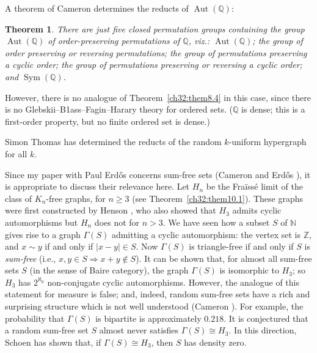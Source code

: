 \documentclass{book}
\newtheorem{theorem}{Theorem}
\DeclareMathOperator{\Sym}{Sym}
\DeclareMathOperator{\Aut}{Aut}
\begin{document}
A theorem of Cameron \cite{ch32:bib4} determines the reducts of
$\Aut(\mathbb{Q})$:

\begin{theorem}\label{ch32:them10.2} 
There are just five closed permutation groups
containing the group $\Aut(\mathbb{Q})$ of order-preserving
permutations of $\mathbb{Q}$, viz.: $\Aut(\mathbb{Q})$; the group of
order preserving or reversing permutations; the group of
permutations preserving a cyclic order; the group of permutations
preserving or reversing a cyclic order; and $\Sym(\mathbb{Q})$.
\end{theorem}

However, there is no analogue of Theorem~\ref{ch32:them8.4} in this
case, since there is no Glebskii--B1ass--Fagin--Harary theory for
ordered sets. ($\mathbb{Q}$ is dense; this is a first-order property,
but no finite ordered set is dense.)

Simon Thomas \cite{ch32:new15} has determined the reducts of the random
$k$-uniform hypergraph for all $k$.

Since my paper with Paul Erd\H{o}s concerns sum-free sets (Cameron
and Erd\H{o}s \cite{ch32:bib8}), it is appropriate to discuss their
relevance here. Let $H_n$ be the Fra\"{i}ss\'{e} limit of the class
of $K_n$-free graphs, for $n \geq 3$ (see
Theorem~\ref{ch32:them10.1}). These graphs were first constructed
by Henson \cite{ch32:bib26}, who also showed that $H_3$ admits
cyclic automorphisms but $H_n$ does not for $n > 3$. We have seen
how a subset $S$ of $\mathbb{N}$ gives rise to a graph $\Gamma(S)$
admitting a cyclic automorphism: the vertex set is $\mathbb{Z}$, and
$x \sim y$ if and only if $|x - y|\in S$. Now $\Gamma(S)$ is
triangle-free if and only if $S$ is \emph{sum-free} (i.e., $x,y
\in S \Rightarrow x + y \notin S$). It can be shown that, for almost
all sum-free sets $S$ (in the sense of Baire category), the graph
$\Gamma(S)$ is isomorphic to $H_3$; so $H_3$ has $2^{\aleph_0}$
non-conjugate cyclic automorphisms. However, the analogue of this
statement for measure is false; and, indeed, random sum-free sets
have a rich and surprising structure which is not well understood
(Cameron \cite{ch32:bib5}). For example, the probability that
$\Gamma(S)$ is bipartite is approximately $0.218$. It is conjectured
that a random sum-free set $S$ almost never satisfies $\Gamma(S)\cong H_3$.
In this direction, Schoen \cite{ch32:new14} has shown that, if
$\Gamma(S)\cong H_3$, then $S$ has density zero.
\end{document}
